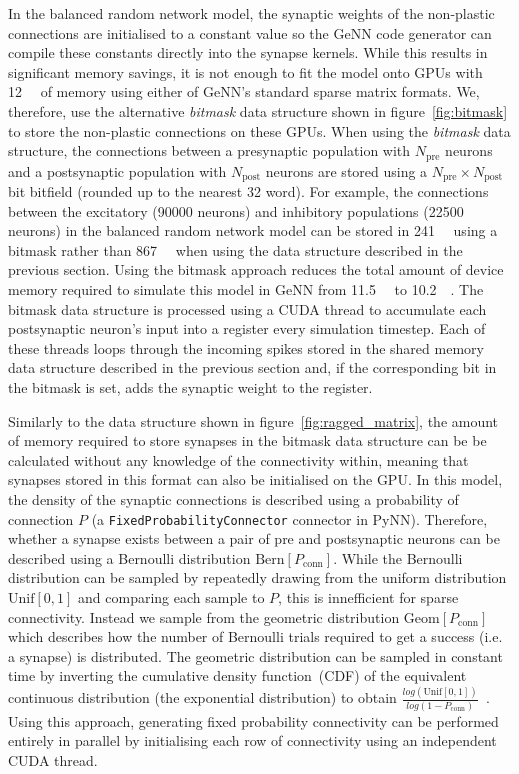 \documentclass[utf8]{frontiersSCNS} %
\begin{document}
In the balanced random network model, the synaptic weights of the non-plastic connections are initialised to a constant value so the GeNN code generator can compile these constants directly into the synapse kernels. 
While this results in significant memory savings, it is not enough to fit the model onto GPUs with \SI{12}{\giga\byte} of memory using either of GeNN's standard sparse matrix formats.
We, therefore, use the alternative \textit{bitmask} data structure shown in figure~\ref{fig:bitmask} to store the non-plastic connections on these GPUs.
When using the \textit{bitmask} data structure, the connections between a presynaptic population with $N_{\text{pre}}$ neurons and a postsynaptic population with $N_{\text{post}}$ neurons are stored using a $N_{\text{pre}} \times N_{\text{post}}$ bit bitfield (rounded up to the nearest \SI{32}{\bit} word).
For example, the connections between the excitatory (\num{90000} neurons) and inhibitory populations (\num{22500} neurons) in the balanced random network model can be stored in \SI{241}{\mebi\byte} using a bitmask rather than \SI{867}{\mebi\byte} when using the data structure described in the previous section.
Using the bitmask approach reduces the total amount of device memory required to simulate this model in GeNN from \SI{11.5}{\giga\byte} to \SI{10.2}{\giga\byte}.
The bitmask data structure is processed using a CUDA thread to accumulate each postsynaptic neuron's input into a register every simulation timestep.
Each of these threads loops through the incoming spikes stored in the shared memory data structure described in the previous section and, if the corresponding bit in the bitmask is set, adds the synaptic weight to the register.

Similarly to the data structure shown in figure~\ref{fig:ragged_matrix}, the amount of memory required to store synapses in the bitmask data structure can be be calculated without any knowledge of the connectivity within, meaning that synapses stored in this format can also be initialised on the GPU.
In this model, the density of the synaptic connections is described using a probability of connection $P$ (a \lstinline{FixedProbabilityConnector} connector in PyNN).
Therefore, whether a synapse exists between a pair of pre and postsynaptic neurons can be described using a Bernoulli distribution $\text{Bern}[P_{\text{conn}}]$.
While the Bernoulli distribution can be sampled by repeatedly drawing from the uniform distribution $\text{Unif}[0, 1]$ and comparing each sample to $P$, this is innefficient for sparse connectivity.
Instead we sample from the geometric distribution $\text{Geom}[P_{\text{conn}}]$ which describes how the number of Bernoulli trials required to get a success (i.e. a synapse) is distributed.
The geometric distribution can be sampled in constant time by inverting the cumulative density function~(CDF) of the equivalent continuous distribution (the exponential distribution) to obtain $\frac{log(\text{Unif}[0, 1])}{log(1 - P_{\text{conn}})}$~\citep[p499]{DevroyeLuc2013}.
Using this approach, generating fixed probability connectivity can be performed entirely in parallel by initialising each row of connectivity using an independent CUDA thread.
\end{document}
